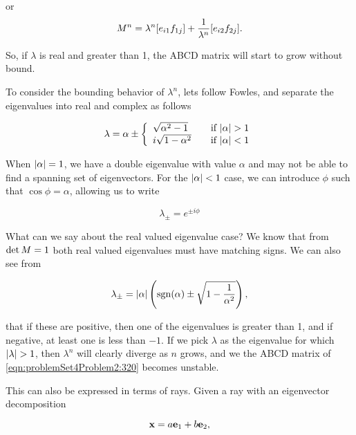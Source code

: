 {or
\begin{dmath}\label{eqn:problemSet4Problem2:320}
M^n
=
\lambda^n [ e_{i 1} f_{1 j} ] + \inv{\lambda^n} [ e_{i 2} f_{2 j} ].
\end{dmath}

So, if $\lambda$ is real and greater than 1, the ABCD matrix will start to grow without bound.

To consider the bounding behavior of $\lambda^n$, lets follow Fowles, and separate the eigenvalues into real and complex as follows

\begin{dmath}\label{eqn:problemSet4Problem2:180}
\lambda = \alpha \pm
\left\{
\begin{array}{l l}
\sqrt{\alpha^2 - 1} & \quad \mbox{if $\Abs{\alpha} > 1$} \\
i \sqrt{1 - \alpha^2} & \quad \mbox{if $\Abs{\alpha} < 1$}
\end{array}
\right.
\end{dmath}

When ${\left\lvert{\alpha}\right\rvert} = 1$, we have a double eigenvalue with value $\alpha$ and may not be able to find a spanning set of eigenvectors.  For the $\Abs{\alpha} < 1$ case, we can introduce $\phi$ such that $\cos\phi = \alpha$, allowing us to write

\begin{dmath}\label{eqn:problemSet4Problem2:1100}
\lambda_{\pm} = e^{\pm i \phi}
\end{dmath}

What can we say about the real valued eigenvalue case?  We know that from $\operatorname{det} M = 1$ both real valued eigenvalues must have matching signs.  We can also see from

\begin{dmath}\label{eqn:problemSet4Problem2:240}
\lambda_{\pm} = \Abs{\alpha} \left( \sgn(\alpha) \pm \sqrt{1 - \inv{\alpha^2}} \right),
\end{dmath}

that if these are positive, then one of the eigenvalues is greater than 1, and if negative, at least one is less than $-1$.  If we pick $\lambda$ as the eigenvalue for which ${\left\lvert{\lambda}\right\rvert} > 1$, then $\lambda^n$ will clearly diverge as $n$ grows, and we the ABCD matrix of \ref{eqn:problemSet4Problem2:320} becomes unstable.

This can also be expressed in terms of rays.  Given a ray with an eigenvector decomposition

\begin{dmath}\label{eqn:problemSet4Problem2:340}
\Bx = a \Be_1 + b \Be_2,
\end{dmath}

}
